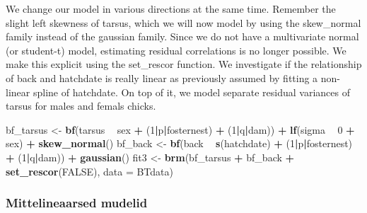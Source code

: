 \documentclass[]{article}
\newenvironment{Shaded}{\begin{snugshade}}{\end{snugshade}}
\newcommand{\KeywordTok}[1]{\textcolor[rgb]{0.13,0.29,0.53}{\textbf{#1}}}
\newcommand{\DataTypeTok}[1]{\textcolor[rgb]{0.13,0.29,0.53}{#1}}
\newcommand{\DecValTok}[1]{\textcolor[rgb]{0.00,0.00,0.81}{#1}}
\newcommand{\StringTok}[1]{\textcolor[rgb]{0.31,0.60,0.02}{#1}}
\newcommand{\OtherTok}[1]{\textcolor[rgb]{0.56,0.35,0.01}{#1}}
\newcommand{\OperatorTok}[1]{\textcolor[rgb]{0.81,0.36,0.00}{\textbf{#1}}}
\newcommand{\NormalTok}[1]{#1}
\begin{document}
We change our model in various directions at the same time. Remember the
slight left skewness of tarsus, which we will now model by using the
skew\_normal family instead of the gaussian family. Since we do not have
a multivariate normal (or student-t) model, estimating residual
correlations is no longer possible. We make this explicit using the
set\_rescor function. We investigate if the relationship of back and
hatchdate is really linear as previously assumed by fitting a non-linear
spline of hatchdate. On top of it, we model separate residual variances
of tarsus for males and femals chicks.

\begin{Shaded}
\begin{Highlighting}[]
\NormalTok{bf_tarsus <-}\StringTok{ }\KeywordTok{bf}\NormalTok{(tarsus }\OperatorTok{~}\StringTok{ }\NormalTok{sex }\OperatorTok{+}\StringTok{ }\NormalTok{(}\DecValTok{1}\OperatorTok{|}\NormalTok{p}\OperatorTok{|}\NormalTok{fosternest) }\OperatorTok{+}\StringTok{ }\NormalTok{(}\DecValTok{1}\OperatorTok{|}\NormalTok{q}\OperatorTok{|}\NormalTok{dam)) }\OperatorTok{+}
\StringTok{  }\KeywordTok{lf}\NormalTok{(sigma }\OperatorTok{~}\StringTok{ }\DecValTok{0} \OperatorTok{+}\StringTok{ }\NormalTok{sex) }\OperatorTok{+}\StringTok{ }\KeywordTok{skew_normal}\NormalTok{()}
\NormalTok{bf_back <-}\StringTok{ }\KeywordTok{bf}\NormalTok{(back }\OperatorTok{~}\StringTok{ }\KeywordTok{s}\NormalTok{(hatchdate) }\OperatorTok{+}\StringTok{ }\NormalTok{(}\DecValTok{1}\OperatorTok{|}\NormalTok{p}\OperatorTok{|}\NormalTok{fosternest) }\OperatorTok{+}\StringTok{ }\NormalTok{(}\DecValTok{1}\OperatorTok{|}\NormalTok{q}\OperatorTok{|}\NormalTok{dam)) }\OperatorTok{+}
\StringTok{  }\KeywordTok{gaussian}\NormalTok{()}
\NormalTok{fit3 <-}\StringTok{ }\KeywordTok{brm}\NormalTok{(bf_tarsus }\OperatorTok{+}\StringTok{ }\NormalTok{bf_back }\OperatorTok{+}\StringTok{ }\KeywordTok{set_rescor}\NormalTok{(}\OtherTok{FALSE}\NormalTok{), }\DataTypeTok{data =}\NormalTok{ BTdata)}
\end{Highlighting}
\end{Shaded}

\subsubsection{Mittelineaarsed mudelid}\label{mittelineaarsed-mudelid}
\end{document}
